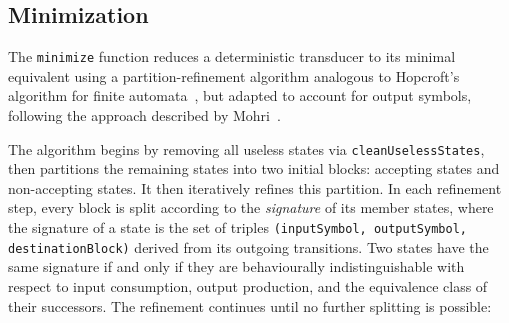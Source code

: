 

\subsection{Minimization}

The \texttt{minimize} function reduces a deterministic transducer to its minimal equivalent using a partition-refinement 
algorithm analogous to Hopcroft's algorithm for finite automata~\cite{hopcroft2006automata}, but adapted to account for output symbols,
following the approach described by Mohri~\cite{mohri1998minimization}.

The algorithm begins by removing all useless states via \texttt{cleanUselessStates}, then partitions the remaining states into 
two initial blocks: accepting states and non-accepting states. It then iteratively refines this partition. 
In each refinement step, every block is split according to the \emph{signature} of its member states, 
where the signature of a state is the set of triples \texttt{(inputSymbol, outputSymbol, destinationBlock)} 
derived from its outgoing transitions. Two states have the same signature if and only if they are behaviourally 
indistinguishable with respect to input consumption, output production, and the equivalence class of their successors. 
The refinement continues until no further splitting is possible:

